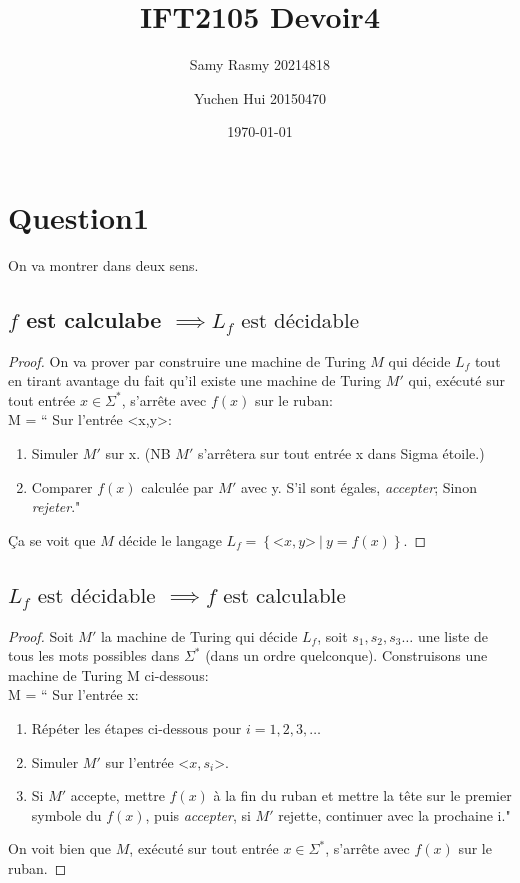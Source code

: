 \documentclass{article}
\title{\textbf{IFT2105 Devoir4}}
\author{
    Samy Rasmy 20214818 \and Yuchen Hui 20150470}
\date{\today}
\begin{document}
\maketitle

\section*{Question1}
On va montrer dans deux sens.
\subsection*{$f$ est calculabe $\implies L_{f} \text{ est décidable}$ }
\begin{proof}
	On va prover par construire une machine de Turing $M$ qui décide $L_{f}$ tout en tirant avantage du fait qu'il existe une machine de Turing $M'$ qui, exécuté sur tout entrée $x \in \Sigma^{*}$, s'arrête avec $f\left( x \right) $ sur le ruban:\\
M = `` Sur l'entrée <x,y>: 
	\begin{enumerate}
		\item Simuler $M'$ sur x. (NB $M'$ s'arrêtera sur tout entrée x dans Sigma étoile.)   
		\item Comparer $f\left( x \right) $ calculée par $M'$ avec y. S'il sont égales, \textit{accepter}; Sinon \textit{rejeter}."
	\end{enumerate}
Ça se voit que  $M$ décide le langage $L_{f} = \left\{ \text{<}x,y\text{>}\ |\  y = f\left( x \right)  \right\} $.
\end{proof}

\subsection*{$L_{f} \text{ est décidable}$ $\implies f \text{ est calculable}$}
\begin{proof}
	Soit $M'$ la machine de Turing qui décide $L_{f}$, soit $s_1, s_2, s_3\ldots$ une liste de tous les mots possibles dans $\Sigma^{*}$ (dans un ordre quelconque). Construisons une machine de Turing M ci-dessous:\\
M = `` Sur l'entrée x: 
	\begin{enumerate}
		\item Répéter les étapes ci-dessous pour $i = 1,2,3,\ldots$ 

		\item \qquad Simuler $M'$ sur l'entrée <$x,s_{i}$>. 
		\item \qquad Si $M'$ accepte, mettre $f\left( x \right) $ à la fin du ruban et mettre la tête sur le premier symbole du $f \left( x \right) $, puis \textit{accepter}, si $M'$ rejette, continuer avec la prochaine i."
	\end{enumerate}
On voit bien que $M$, exécuté sur tout entrée $x \in \Sigma^{*}$, s'arrête avec $f\left( x \right) $ sur le ruban.
\end{proof}
\end{document}
